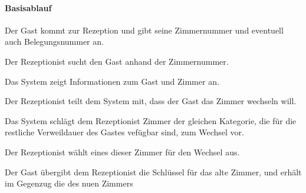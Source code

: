 \paragraph{Basisablauf}
\begin{longenum}
	\item Der \Gls{Gast} kommt zur \Gls{Rezeption} und gibt seine Zimmernummer und eventuell auch \Gls{Belegungsnummer} an.
	\item Der \Gls{Rezeptionist} sucht den Gast anhand der Zimmernummer.
	\item Das System zeigt Informationen zum \Gls{Gast} und \Gls{Zimmer} an.
	\item Der \Gls{Rezeptionist} teilt dem System mit, dass der \Gls{Gast} das \Gls{Zimmer} wechseln will.
	\item Das System schlägt dem \Gls{Rezeptionist} \Gls{Zimmer} der gleichen Kategorie, die für die restliche Verweildauer des \Gls{Gast}es vefügbar sind, zum Wechsel vor.
	\item Der \Gls{Rezeptionist} wählt eines dieser Zimmer für den Wechsel aus.
	\item Der \Gls{Gast} übergibt dem \Gls{Rezeptionist} die Schlüssel für das alte Zimmer, und erhält im Gegenzug die des nuen Zimmers
\end{longenum}

